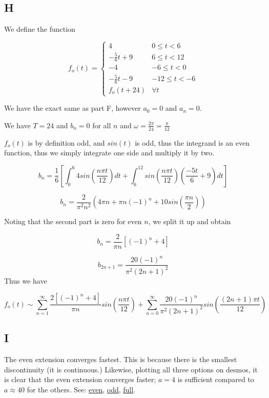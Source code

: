 \documentclass{article}
\begin{document}
\subsection*{H}

We define the function

\[ f_o(t) = \begin{cases}
      4 & 0\leq t < 6 \\
      -\frac{5}{6}t+9 & 6\leq t < 12 \\
      -4 & -6\leq t < 0 \\
      -\frac{5}{6}t-9 & -12 \leq t < -6 \\
      f_o(t + 24) & \forall t
   \end{cases}
\]  

We have the exact same as part F, however $a_0=0$ and $a_n=0$.

We have $T=24$ and $b_n=0$ for all $n$ and $\omega = \frac{2\pi}{24} = \frac{\pi}{12}$

$f_o(t)$ is by definition odd, and $sin(t)$ is odd, thus the integrand is an even function, thus we simply integrate one side and multiply it by two.

$$
b_n = \frac{1}{6} \left[ \int_0^{6} 4 sin\left( \frac{n \pi t}{12} \right) dt + \int_6^{12} sin\left(\frac{n \pi t}{12}\right)\left(\frac{-5t}{6}+9\right)dt\right]
$$

$$
b_n = \frac{2}{\pi^2n^2} \left( 4\pi n + \pi n \left(-1\right)^n + 10sin\left(\frac{\pi n}{2}\right)\right)
$$

Noting that the second part is zero for even $n$, we split it up and obtain

$$
b_n = \frac{2}{\pi n} \left[\left(-1\right)^n+4\right]
$$

$$
b_{2n+1} = \frac{20\left(-1\right)^n}{\pi^2\left(2n+1\right)^2}
$$
Thus we have

$$
f_o(t) \sim \sum_{n=1}^{\infty} \frac{2\left[\left(-1\right)^n+4\right]}{\pi n} sin\left(\frac{n \pi t}{12}\right) + \sum_{n=0}^{\infty} \frac{20\left(-1\right)^n}{\pi^2\left(2n+1\right)^2} sin\left(\frac{\left(2n+1\right) \pi t}{12}\right)
$$


\subsection*{I}

The even extension converges fastest.  This is because there is the smallest discontinuity (it is continuous.)
Likewise, plotting all three options on desmos, it is clear that the even extension converges faster; $a=4$ is sufficient compared to $a \approx 40$ for the others.
See: \href{https://www.desmos.com/calculator/1twteyxxyg}{even}, \href{https://www.desmos.com/calculator/ao6mjhce0y}{odd}, \href{https://www.desmos.com/calculator/bk2vlfzv0c}{full}.
\end{document}
